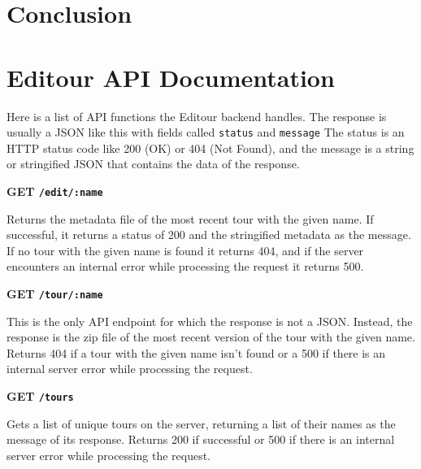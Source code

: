 \documentclass[a4paper, 10pt, american, titlepage]{article}
\newenvironment{indented}[1]%
{\begin{list}{}%
	{\setlength{\leftmargin}{#1}}%
	\item[]%
}
{\end{list}}
\begin{document}
\newpage

\section{Conclusion}
\label{sec:conclusion}

\nocite{harvey2002} %

\newpage %

\printbibliography
{}

\newpage

\appendices
\section{Editour API Documentation}

Here is a list of API functions the Editour backend handles. The response is
usually a JSON like this with fields called \texttt{status} and \texttt{message}
The status is an HTTP status code like 200 (OK) or 404 (Not Found), and the
message is a string or stringified JSON that contains the data of the response.

\noindent\textbf{GET \texttt{/edit/:name}}

\begin{indented}{1cm}
	Returns the metadata file of the most recent tour with the given name. If
	successful, it returns a status of 200 and the stringified metadata as the
	message. If no tour with the given name is found it returns 404, and if the
	server encounters an internal error while processing the request it returns
	500.
\end{indented}

\noindent\textbf{GET \texttt{/tour/:name}}

\begin{indented}{1cm}
	This is the only API endpoint for which the response is not a JSON. Instead,
	the response is the zip file of the most recent version of the tour with the
	given name. Returns 404 if a tour with the given name isn't found or a 500
	if there is an internal server error while processing the request.
\end{indented}

\noindent\textbf{GET \texttt{/tours}}

\begin{indented}{1cm}
	Gets a list of unique tours on the server, returning a list of their names
	as the message of its response. Returns 200 if successful or 500 if there is
	an internal server error while processing the request.
\end{indented}
\end{document}
